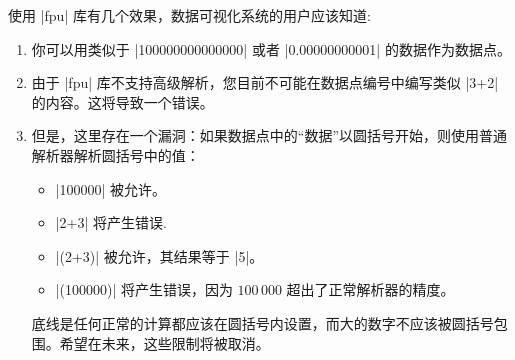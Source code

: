 使用 |fpu| 库有几个效果，数据可视化系统的用户应该知道:
%
\begin{enumerate}
    \item 你可以用类似于 |100000000000000| 或者 |0.00000000001| 的数据作为数据点。
    \item 由于 |fpu| 库不支持高级解析，您目前不可能在数据点编号中编写类似 |3+2| 的内容。这将导致一个错误。
    \item 但是，这里存在一个漏洞：如果数据点中的``数据''以圆括号开始，则使用普通解析器解析圆括号中的值：
        \begin{itemize}
            \item |100000| 被允许。
            \item |2+3| 将产生错误.
            \item |(2+3)| 被允许，其结果等于 |5|。
            \item |(100000)| 将产生错误，因为 $100\,000$ 超出了正常解析器的精度。
        \end{itemize}
        底线是任何正常的计算都应该在圆括号内设置，而大的数字不应该被圆括号包围。希望在未来，这些限制将被取消。
\end{enumerate}


